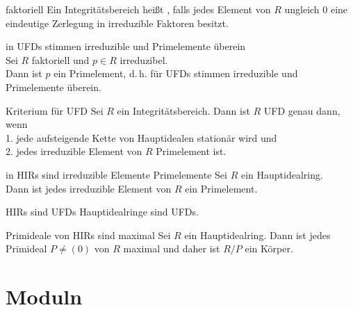 \begin{Def}{faktoriell}
    Ein Integritätsbereich heißt , falls jedes Element von $R$ ungleich
    $0$ eine eindeutige Zerlegung in irreduzible Faktoren besitzt.
\end{Def}

\begin{Satz}{in UFDs stimmen irreduzible und Primelemente überein} \\
    Sei $R$ faktoriell und $p \in R$ irreduzibel. \\
    Dann ist $p$ ein Primelement, d.\,h. für UFDs stimmen irreduzible und
    Primelemente überein.
\end{Satz}

\begin{Satz}{Kriterium für UFD}
    Sei $R$ ein Integritätsbereich.
    Dann ist $R$ UFD genau dann, wenn \\
    1. jede aufsteigende Kette von Hauptidealen stationär wird und \\
    2. jedes irreduzible Element von $R$ Primelement ist.
\end{Satz}

\begin{Satz}{in HIRs sind irreduzible Elemente Primelemente}
    Sei $R$ ein Hauptidealring. \\
    Dann ist jedes irreduzible Element von $R$ ein Primelement.
\end{Satz}

\begin{Satz}{HIRs sind UFDs}
    Hauptidealringe sind UFDs.
\end{Satz}

\begin{Satz}{Primideale von HIRs sind maximal}
    Sei $R$ ein Hauptidealring.
    Dann ist jedes Primideal $P \not= (0)$ von $R$ maximal und daher ist
    $R/P$ ein Körper.
\end{Satz}

\pagebreak

\section{%
    Moduln%
}

